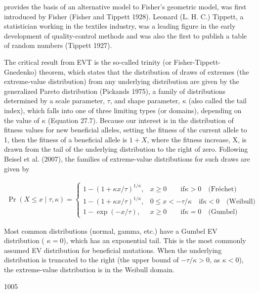 \documentclass{article}
\begin{document}
provides the basis of an alternative model to Fisher's geometric model, was first introduced by Fisher (Fisher and Tippett 1928). Leonard (L. H. C.) Tippett, a statistician working in the textiles industry, was a leading figure in the early development of quality-control methods and was also the first to publish a table of random numbers (Tippett 1927).

The critical result from EVT is the so-called trinity (or Fisher-Tippett-Gnedenko) theorem, which states that the distribution of draws of extremes (the extreme-value distribution) from any underlying distribution are given by the generalized Pareto distribution (Pickands 1975), a family of distributions determined by a scale parameter,  $ \tau $, and shape parameter,  $ \kappa $ (also called the tail index), which falls into one of three limiting types (or domains), depending on the value of  $ \kappa $ (Equation 27.7). Because our interest is in the distribution of fitness values for new beneficial alleles, setting the fitness of the current allele to 1, then the fitness of a beneficial allele is  $ 1 + X $, where the fitness increase, X, is drawn from the tail of the underlying distribution to the right of zero. Following Beisel et al. (2007), the families of extreme-value distributions for such draws are given by

\begin{equation}
\begin{align*}\Pr(X\leq x\mid\tau,\kappa)=\begin{cases}1-(1+\kappa x/\tau)^{1/\kappa},&x\geq0\qquad\textrm{if}\kappa>0\quad\textrm{(Fréchet)}\\1-(1+\kappa x/\tau)^{1/\kappa},&0\leq x<-\tau/\kappa\quad\textrm{if}\kappa<0\quad\textrm{(Weibull)}\\1-\exp(-x/\tau),&x\geq0\qquad\textrm{if}\kappa=0\quad\textrm{(Gumbel)}\end{cases}\end{align*}
\tag{27.7}
\label{eq:27_7}
\end{equation}

Most common distributions (normal, gamma, etc.) have a Gumbel EV distribution ( $ \kappa = 0 $), which has an exponential tail. This is the most commonly assumed EV distribution for beneficial mutations. When the underlying distribution is truncated to the right (the upper bound of  $ -\tau/\kappa > 0 $, as  $ \kappa < 0 $), the extreme-value distribution is in the Weibull domain.

1005
\end{document}
